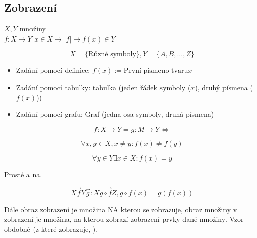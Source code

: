 \documentclass[12pt]{article}					%
\begin{document}
    \subsection{Zobrazení}
        $X, Y$ množiny\\
        $f: X \longrightarrow Y$ $x \in X \longrightarrow |f| \longrightarrow f(x) \in Y$

        \begin{priklady}
            $$ X = \{\text{Různé symboly}\}, Y = \{A, B, …, Z\}$$
            \begin{itemize}
                \item Zadání pomocí definice: $f(x):= \text{První písmeno tvaru} x$
                \item Zadání pomocí tabulky: tabulka (jeden řádek symboly ($x$), druhý písmena ($f(x)$))
                \item Zadání pomocí grafu: Graf (jedna osa symboly, druhá písmena)
            \end{itemize}
        \end{priklady}

        \begin{definice}  
            $$ f: X \longrightarrow Y = g: M \longrightarrow Y \Leftrightarrow$$
            $$  $$ 
        \end{definice}

        \begin{definice}[Prosté (= injektivní)]
            $$ \forall x,y \in X, x \neq y: f(x) \neq f(y) $$ 
        \end{definice}

        \begin{definice}[Na (= surjektivní)]
            $$ \forall y \in Y \exists x \in X: f(x) = y $$ 
        \end{definice}

        \begin{definice}[Vzájemně jednoznačné (= bijektivní)]
            Prosté a na.
        \end{definice}

        \begin{definice}[Skládání]
            $$ X \stackrel{\longrightarrow}{f} Y \stackrel{\longrightarrow}{g}: X \stackrel{\longrightarrow}{g\circ f} Z, g\circ f(x) = g(f(x)) $$ 
        \end{definice}

        Dále obraz zobrazení je množina NA kterou se zobrazuje, obraz množiny v zobrazení je množina, na kterou zobrazí zobrazení prvky dané množiny. Vzor obdobně (z které zobrazuje, ).
\end{document}
